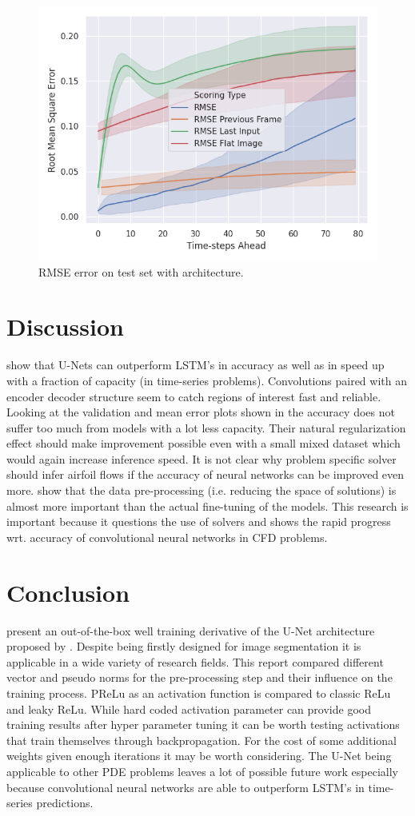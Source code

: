 \documentclass[acmtog]{techreportacmart}
\begin{document}
\begin{figure}[H]
  \includegraphics[width=.4\textwidth]{figures/transfer/Transfer_Test_RMSE_Quality_start_15}
  \caption{RMSE error on test set with \cite{Fotiadis2020} architecture.}
  \label{fig:T2}
\end{figure}


\section{Discussion}
\cite{Fotiadis2020} show that U-Nets can outperform LSTM's in accuracy as well as in speed 
up with a fraction of capacity (in time-series problems). Convolutions paired with an encoder 
decoder structure seem to catch regions of interest fast and reliable. Looking at the validation 
and mean error plots shown in \cite{Thuerey20} the accuracy does not suffer too much from models 
with a lot less capacity. Their natural regularization effect should make improvement possible 
even with a small mixed dataset which would again increase inference speed. It is not clear 
why problem specific solver should infer airfoil flows if the accuracy of neural networks 
can be improved even more. \cite{Thuerey20} show that the data pre-processing (i.e. reducing 
the space of solutions) is almost more important than the actual fine-tuning of the models. 
This research is important because it questions the use of solvers and shows the rapid progress 
wrt. accuracy of convolutional neural networks in CFD problems.

\section{Conclusion} 
\cite{Thuerey20} present an out-of-the-box well training derivative of the U-Net architecture 
proposed by \cite{ronneberger2015}. Despite being firstly designed for image segmentation it is 
applicable in a wide variety of research fields. This report compared different vector and pseudo 
norms for the pre-processing step and their influence on the training process. PReLu as an activation 
function is compared to classic ReLu and leaky ReLu. While hard coded activation parameter can provide 
good training results after hyper parameter tuning it can be worth testing activations that train 
themselves through backpropagation. For the cost of some additional weights given enough iterations 
it may be worth considering. The U-Net being applicable to other PDE problems leaves a lot of possible 
future work especially because convolutional neural networks are able to outperform LSTM's in time-series predictions.\\
\end{document}
